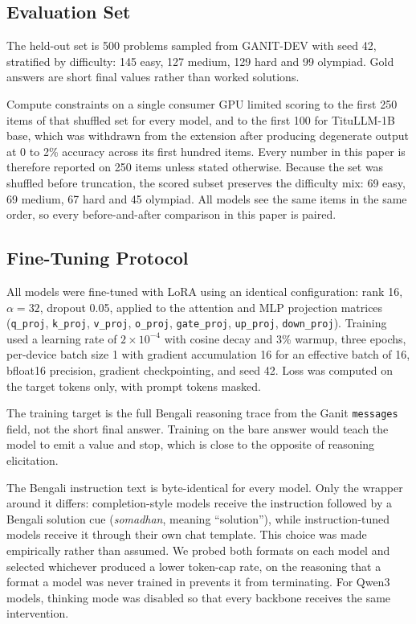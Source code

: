 \subsection{Evaluation Set}

The held-out set is 500 problems sampled from GANIT-DEV with seed 42,
stratified by difficulty: 145 easy, 127 medium, 129 hard and 99 olympiad. Gold
answers are short final values rather than worked solutions.

Compute constraints on a single consumer GPU limited scoring to the first 250
items of that shuffled set for every model, and to the first 100 for TituLLM-1B
base, which was withdrawn from the extension after producing degenerate output
at 0 to 2\% accuracy across its first hundred items. Every number in this paper
is therefore reported on 250 items unless stated otherwise. Because the set was
shuffled before truncation, the scored subset preserves the difficulty mix: 69
easy, 69 medium, 67 hard and 45 olympiad. All models see the same items in the
same order, so every before-and-after comparison in this paper is paired.

\subsection{Fine-Tuning Protocol}

All models were fine-tuned with LoRA \parencite{hu2021lora} using an identical
configuration: rank 16, $\alpha=32$, dropout 0.05, applied to the attention and
MLP projection matrices (\texttt{q\_proj}, \texttt{k\_proj}, \texttt{v\_proj},
\texttt{o\_proj}, \texttt{gate\_proj}, \texttt{up\_proj}, \texttt{down\_proj}).
Training used a learning rate of $2\times10^{-4}$ with cosine decay and 3\%
warmup, three epochs, per-device batch size 1 with gradient accumulation 16 for
an effective batch of 16, bfloat16 precision, gradient checkpointing, and seed
42. Loss was computed on the target tokens only, with prompt tokens masked.

The training target is the full Bengali reasoning trace from the Ganit
\texttt{messages} field, not the short final answer. Training on the bare answer
would teach the model to emit a value and stop, which is close to the opposite
of reasoning elicitation.

The Bengali instruction text is byte-identical for every model. Only the wrapper
around it differs: completion-style models receive the instruction followed by a Bengali
solution cue (\emph{somadhan}, meaning ``solution''), while instruction-tuned
models receive it through their own chat template. This choice was made empirically rather than assumed. We probed
both formats on each model and selected whichever produced a lower token-cap
rate, on the reasoning that a format a model was never trained in prevents it
from terminating. For Qwen3 models, thinking mode was disabled so that every
backbone receives the same intervention.

